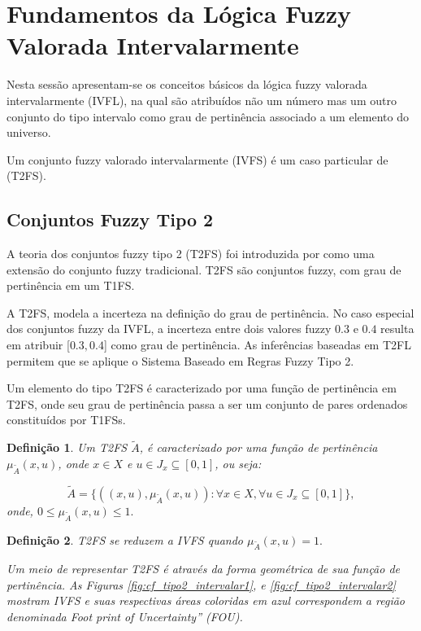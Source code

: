 \documentclass[tcc,capa]{texufpel}
\newtheorem{Def}{Defini\c c\~ao}
\begin{document}
\section{Fundamentos da Lógica Fuzzy Valorada Intervalarmente}

Nesta sessão apresentam-se os conceitos básicos da lógica fuzzy valorada intervalarmente (IVFL), na qual são atribuídos não um número mas um outro conjunto do tipo intervalo como grau de pertinência associado a um elemento do universo.

Um conjunto fuzzy valorado intervalarmente (IVFS) é um caso particular de (T2FS).

\subsection{Conjuntos Fuzzy Tipo 2}

A teoria dos conjuntos fuzzy tipo 2 (T2FS) foi introduzida por \cite{zadeh1975concept} como uma extensão do conjunto fuzzy tradicional. T2FS são conjuntos fuzzy, com grau de pertinência em um T1FS.

A T2FS, modela a incerteza na definição do grau de pertinência. No caso especial dos conjuntos fuzzy da IVFL, a incerteza entre dois valores fuzzy $0.3$ e $0.4$ resulta em atribuir [$0.3,0.4$] como grau de pertinência. As inferências baseadas em T2FL permitem que se aplique o Sistema Baseado em Regras Fuzzy Tipo 2.

Um elemento do tipo T2FS é caracterizado por uma função de pertinência em T2FS, onde seu grau de pertinência passa a ser um conjunto de pares ordenados constituídos por T1FSs.

\begin{Def} \label{defconjtipo2}
Um T2FS $\tilde{A}$, é caracterizado por uma função de pertinência $\mu_{\tilde{A}}(x,u)$, onde $x \in X$ e $u \in J_{x} \subseteq [0,1]$, ou seja:

\begin{equation}
\tilde{A} = \{((x,u), \mu_{\tilde{A}}(x,u)): \forall x \in X, \forall u \in J_{x} \subseteq [0,1] \},
\end{equation}
onde, $0 \leq \mu_{\tilde{A}}(x,u) \leq 1.$
\end{Def}


\begin{Def}
T2FS se reduzem a IVFS quando $\mu_{\tilde{A}}(x,u)=1.$

Um meio de representar T2FS é através da forma geométrica de sua função de pertinência. As Figuras \ref{fig:cf_tipo2_intervalar1}, e \ref{fig:cf_tipo2_intervalar2} mostram IVFS e suas respectivas áreas coloridas em azul correspondem a região denominada {Foot print of Uncertainty}'' (FOU).
\end{Def}
\end{document}
